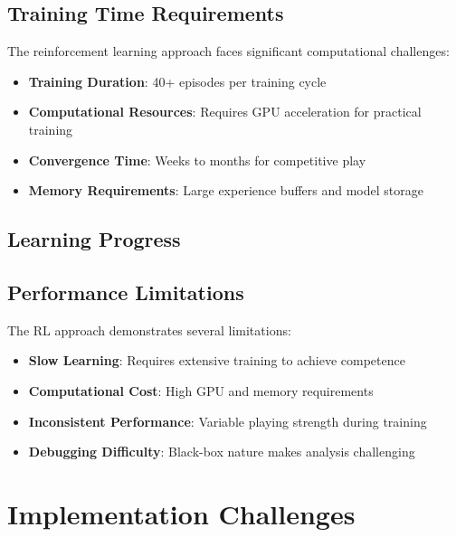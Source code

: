 \documentclass[11pt,a4paper]{report}
\begin{document}
\subsection{Training Time Requirements}
The reinforcement learning approach faces significant computational challenges:

\begin{itemize}
    \item \textbf{Training Duration}: 40+ episodes per training cycle
    \item \textbf{Computational Resources}: Requires GPU acceleration for practical training
    \item \textbf{Convergence Time}: Weeks to months for competitive play
    \item \textbf{Memory Requirements}: Large experience buffers and model storage
\end{itemize}

\subsection{Learning Progress}

\subsection{Performance Limitations}
The RL approach demonstrates several limitations:

\begin{itemize}
    \item \textbf{Slow Learning}: Requires extensive training to achieve competence
    \item \textbf{Computational Cost}: High GPU and memory requirements
    \item \textbf{Inconsistent Performance}: Variable playing strength during training
    \item \textbf{Debugging Difficulty}: Black-box nature makes analysis challenging
\end{itemize}

\section{Implementation Challenges}
\end{document}
